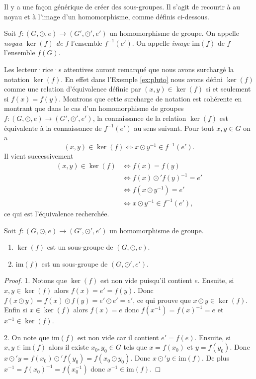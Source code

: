\documentclass[french,course,oneside,theoremnosection]{lecture}
\newcommand{\im}{\mathrm{im}}
\begin{document}
Il y a une façon générique de créer des sous-groupes. Il s'agit de recourir à au noyau et à l'image d'un homomorphisme, comme définis ci-dessous.

\begin{definition}\label{def:kerim}
Soit $f\colon (G, \odot, e) \to (G', \odot', e')$ un homomorphisme de groupe. On appelle \emph{noyau $\ker(f)$ de $f$} l'ensemble $f^{-1}(e')$. On appelle  \emph{image $\im(f)$} de $f$ l'ensemble $f(G)$. 
\end{definition}

\begin{remark}
Les lecteur·rice·s attentives auront remarqué que nous avons surchargé la notation $\ker(f)$. En effet dans l'Exemple \ref{ex:pluto} nous avons défini $\ker(f)$ comme une relation d'équivalence définie par $(x,y)\in \ker(f)$ si et seulement si $f(x)=f(y)$. Montrons que cette surcharge de notation est cohérente en montrant que dans le cas d'un homomorphisme  de groupes $f\colon (G, \odot, e) \to (G', \odot', e')$, la connaissance de la relation $\ker(f)$ est équivalente à la connaissance de $f^{-1}(e')$ au sens suivant. Pour tout $x, y \in G$ on a
\[
(x,y) \in \ker(f) \iff x\odot y^{-1} \in f^{-1}(e').
\]
Il vient successivement
\begin{align*}
(x,y) \in \ker(f) & \iff f(x) =  f(y)\\
& \iff f(x) \odot' f(y)^{-1} = e'\\
& \iff f(x\odot y^{-1}) = e'\\
&  \iff x\odot y^{-1}\in f^{-1}(e'),
\end{align*}
ce qui est l'équivalence recherchée.
\end{remark}

\begin{proposition}
Soit $f\colon (G, \odot, e) \to (G', \odot', e')$ un homomorphisme de groupe.
\begin{enumerate}
\item $\ker(f)$ est un sous-groupe de $(G, \odot, e)$.
\item $\im(f)$ est un sous-groupe de $(G, \odot', e')$.
\end{enumerate}
\end{proposition}
\begin{proof}
1. Notons que $\ker(f)$ est non vide puisqu'il contient $e$. Ensuite, si $x, y \in \ker(f)$ alors $f(x)=e'=f(y)$. Donc $f(x\odot y)=f(x) \odot f(y)=e' \odot e'=e'$, ce qui prouve que $x\odot y \in \ker(f)$. Enfin si $x\in \ker(f)$ alors $f(x)=e$ donc $f(x^{-1})=f(x)^{-1}=e$ et $x^{-1}\in \ker (f)$.

2. On note que $\im(f)$ est non vide car il contient $e'=f(e)$. Ensuite, si $x, y \in \im(f)$ alors il existe $x_0, y_0\in G$ tels que $x=f(x_0)$ et $y=f(y_0)$. Donc $x \odot' y= f(x_0) \odot' f(y_0)=f(x_0\odot y_0)$. Donc $x\odot' y\in \im(f)$. De plus $x^{-1} = f(x_0)^{-1} = f(x_0^{-1})$ donc $x^{-1}\in \im(f)$.
\end{proof}
\end{document}
